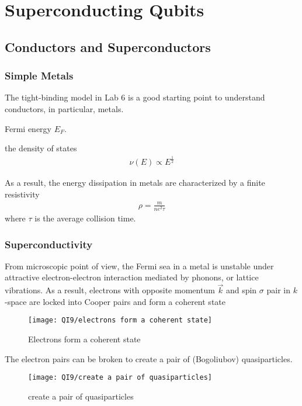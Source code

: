 \newpage
\section{Superconducting Qubits}

\subsection{Conductors and Superconductors}

\subsubsection{Simple Metals}
The tight-binding model in Lab 6 is a good starting point to understand conductors, in particular, metals. 

Fermi energy $E_F$.

the density of states
\begin{align*}
    \nu(E)\propto  E^{\frac{1}{2}}
\end{align*}

As a result, the energy dissipation in metals are characterized by a finite resistivity
\begin{align*}
    \rho=\frac{m}{ne^2 \tau }
\end{align*}
where $\tau$ is the average collision time. 

\subsubsection{Superconductivity}
From microscopic point of view, the Fermi sea in a metal is unstable under attractive electron-electron interaction mediated by phonons, or lattice vibrations. As a result, electrons with opposite momentum $\vec{k}$ and spin $\sigma$ pair in $k$-space are locked into Cooper pairs and form a coherent state

\begin{figure}[H]
    \centering
    \texttt{[image: QI9/electrons form a coherent state]}
    \caption{Electrons form a coherent state}
\end{figure}

The electron pairs can be broken to create a pair of (Bogoliubov) quasiparticles. 

\begin{figure}[H]
    \centering
    \texttt{[image: QI9/create a pair of quasiparticles]}
    \caption{create a pair of quasiparticles}
\end{figure}

